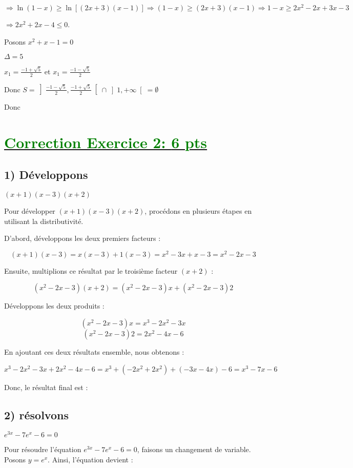 \documentclass[12pt]{article}
\begin{document}
$\Longrightarrow \ln(1-x) \geq \ln\left[ (2x+3)(x-1)\right]  \Longrightarrow (1-x) \geq (2x+3)(x-1) \Longrightarrow 1-x \geq 2x^{2}-2x+3x-3$

$\Longrightarrow 2x^{2}+2x-4 \leq 0 $.

Posons $x^{2}+x-1 = 0$

$\Delta=5$

$x_{1}=\frac{-1+\sqrt{5}}{2}$ et $x_{1}=\frac{-1-\sqrt{5}}{2}$

Donc $ S=\left]\frac{-1-\sqrt{5}}{2}, \frac{-1+\sqrt{5}}{2} \right[ \cap \left]1, +\infty\right[=\emptyset$

Donc \textcolor{green}{}
\section*{\underline{\textcolor{green}{Correction Exercice 2: \textbf{6 pts}}}}

\subsection*{1) Développons } \((x+1)(x-3)(x+2)\)

Pour développer \((x+1)(x-3)(x+2)\), procédons en plusieurs étapes en utilisant la distributivité.

D'abord, développons les deux premiers facteurs :

\[
(x+1)(x-3) = x(x-3) + 1(x-3) = x^2 - 3x + x - 3 = x^2 - 2x - 3
\]

Ensuite, multiplions ce résultat par le troisième facteur \((x+2)\) :

\[
(x^2 - 2x - 3)(x+2) = (x^2 - 2x - 3)x + (x^2 - 2x - 3)2
\]

Développons les deux produits :

\[
(x^2 - 2x - 3)x = x^3 - 2x^2 - 3x
\]
\[
(x^2 - 2x - 3)2 = 2x^2 - 4x - 6
\]

En ajoutant ces deux résultats ensemble, nous obtenons :

\[
x^3 - 2x^2 - 3x + 2x^2 - 4x - 6 = x^3 + (-2x^2 + 2x^2) + (-3x - 4x) - 6 = x^3 - 7x - 6
\]

Donc, le résultat final est :
\textcolor{green}{}
\subsection*{2) résolvons } \(e^{3x}-7e^{x}-6=0\)

Pour résoudre l'équation \(e^{3x} - 7e^{x} - 6 = 0\), faisons un changement de variable. Posons \(y = e^x\). Ainsi, l'équation devient :
\end{document}
